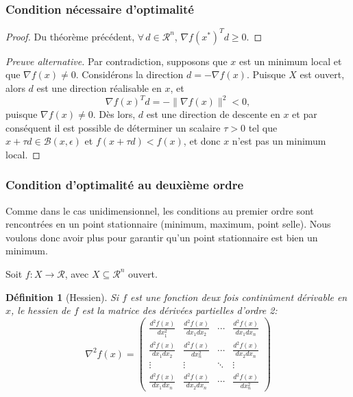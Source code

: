 \documentclass[usepdftitle=false]{beamer}
\newtheorem{defn}{Définition}
\def\cB{\mathcal{B}}
\def\cR{\mathcal{R}}
\begin{document}
\begin{frame}
\frametitle{Condition nécessaire d'optimalité}

\begin{proof}
Du théorème précédent, $\forall\, d \in \cR^n$, $\nabla f(x^*)^T d \geq 0$.
\end{proof}

\begin{proof}[Preuve alternative]
Par contradiction, supposons que $x$ est un minimum local et que $\nabla f(x) \ne 0$. Considérons la direction $d = -\nabla f(x)$.
Puisque $X$ est ouvert, alors $d$ est une direction réalisable en $x$, et
$$
\nabla f(x)^Td = -\| \nabla f(x) \|^2 < 0,
$$
puisque $\nabla f(x) \ne 0$.
Dès lors, $d$ est une direction de descente en $x$ et par conséquent il est possible de déterminer un scalaire $\tau >0$ tel que $x + \tau d \in \cB(x, \epsilon)$ et $f(x + \tau d) < f(x)$, et donc $x$ n'est pas un minimum local.
\end{proof}

\end{frame}

\begin{frame}
\frametitle{Condition d'optimalité au deuxième ordre}

Comme dans le cas unidimensionnel, les conditions au premier ordre sont rencontrées en un point stationnaire (minimum, maximum, point selle).
Nous voulons donc avoir plus pour garantir qu'un point stationnaire est bien un minimum.

\mbox{}

Soit $f: X \rightarrow \cR$, avec $X \subseteq \cR^n$ ouvert.

\begin{defn}[Hessien]
Si $f$ est une fonction deux fois continûment dérivable en $x$, le hessien de $f$ est la matrice des dérivées partielles d'ordre 2:
$$
\nabla^2 f(x) =
\begin{pmatrix}
\frac{d^2f(x)}{dx_1^2} & \frac{d^2f(x)}{dx_1dx_2} & \cdots & \frac{d^2f(x)}{dx_1dx_n}\\
\frac{d^2f(x)}{dx_1dx_2} & \frac{d^2f(x)}{dx_n^2} & \cdots & \frac{d^2f(x)}{dx_2dx_n}\\
\vdots & \vdots & \ddots & \vdots \\
\frac{d^2f(x)}{dx_1dx_n} & \frac{d^2f(x)}{dx_2dx_n} & \cdots & \frac{d^2f(x)}{dx_n^2}
\end{pmatrix}
$$
\end{defn}

\end{frame}
\end{document}
